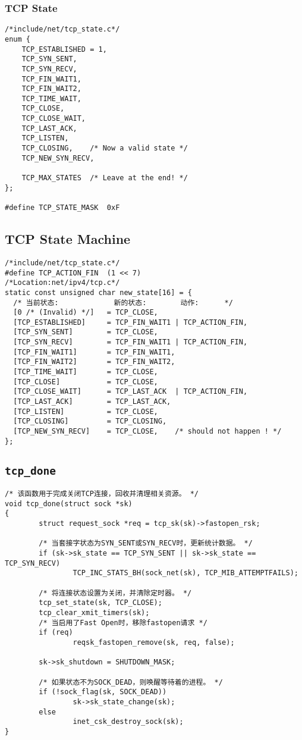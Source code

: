         \subsubsection{TCP State}
\begin{verbatim}
/*include/net/tcp_state.c*/
enum {
    TCP_ESTABLISHED = 1,
    TCP_SYN_SENT,
    TCP_SYN_RECV,
    TCP_FIN_WAIT1,
    TCP_FIN_WAIT2,
    TCP_TIME_WAIT,
    TCP_CLOSE,
    TCP_CLOSE_WAIT,
    TCP_LAST_ACK,
    TCP_LISTEN,
    TCP_CLOSING,    /* Now a valid state */
    TCP_NEW_SYN_RECV,

    TCP_MAX_STATES  /* Leave at the end! */
};

#define TCP_STATE_MASK  0xF
\end{verbatim}

        \subsection{TCP State Machine}

\begin{verbatim}
/*include/net/tcp_state.c*/
#define TCP_ACTION_FIN  (1 << 7)
/*Location:net/ipv4/tcp.c*/
static const unsigned char new_state[16] = {
  /* 当前状态:             新的状态:        动作:      */
  [0 /* (Invalid) */]   = TCP_CLOSE,
  [TCP_ESTABLISHED]     = TCP_FIN_WAIT1 | TCP_ACTION_FIN,
  [TCP_SYN_SENT]        = TCP_CLOSE,
  [TCP_SYN_RECV]        = TCP_FIN_WAIT1 | TCP_ACTION_FIN,
  [TCP_FIN_WAIT1]       = TCP_FIN_WAIT1,
  [TCP_FIN_WAIT2]       = TCP_FIN_WAIT2,
  [TCP_TIME_WAIT]       = TCP_CLOSE,
  [TCP_CLOSE]           = TCP_CLOSE,
  [TCP_CLOSE_WAIT]      = TCP_LAST_ACK  | TCP_ACTION_FIN,
  [TCP_LAST_ACK]        = TCP_LAST_ACK,
  [TCP_LISTEN]          = TCP_CLOSE,
  [TCP_CLOSING]         = TCP_CLOSING,
  [TCP_NEW_SYN_RECV]    = TCP_CLOSE,    /* should not happen ! */
};
\end{verbatim}
    \subsection{\texttt{tcp_done}}
\begin{verbatim}
/* 该函数用于完成关闭TCP连接，回收并清理相关资源。 */
void tcp_done(struct sock *sk)
{
        struct request_sock *req = tcp_sk(sk)->fastopen_rsk;

        /* 当套接字状态为SYN_SENT或SYN_RECV时，更新统计数据。 */
        if (sk->sk_state == TCP_SYN_SENT || sk->sk_state == TCP_SYN_RECV)
                TCP_INC_STATS_BH(sock_net(sk), TCP_MIB_ATTEMPTFAILS);

        /* 将连接状态设置为关闭，并清除定时器。 */
        tcp_set_state(sk, TCP_CLOSE);
        tcp_clear_xmit_timers(sk);
        /* 当启用了Fast Open时，移除fastopen请求 */
        if (req)
                reqsk_fastopen_remove(sk, req, false);

        sk->sk_shutdown = SHUTDOWN_MASK;

        /* 如果状态不为SOCK_DEAD，则唤醒等待着的进程。 */
        if (!sock_flag(sk, SOCK_DEAD))
                sk->sk_state_change(sk);
        else
                inet_csk_destroy_sock(sk);
}
\end{verbatim}
